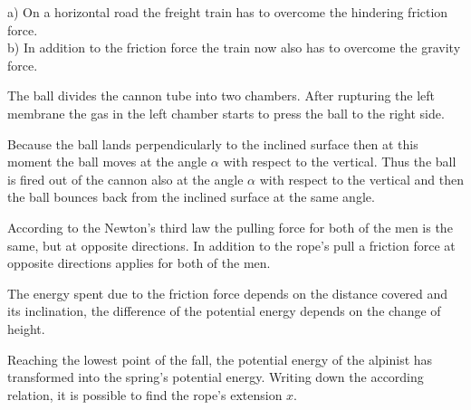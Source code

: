 \documentclass[11pt]{article}
\begin{document}
\hinteng
a) On a horizontal road the freight train has to overcome the hindering friction force.\\
b) In addition to the friction force the train now also has to overcome the gravity force.
\probend
\bigskip


\hinteng
The ball divides the cannon tube into two chambers. After rupturing the left membrane the gas in the left chamber starts to press the ball to the right side.
\probend
\bigskip


\hinteng
Because the ball lands perpendicularly to the inclined surface then at this moment the ball moves at the angle $\alpha$ with respect to the vertical. Thus the ball is fired out of the cannon also at the angle $\alpha$ with respect to the vertical and then the ball bounces back from the inclined surface at the same angle.
\probend
\bigskip


\hinteng
According to the Newton’s third law the pulling force for both of the men is the same, but at opposite directions. In addition to the rope’s pull a friction force at opposite directions applies for both of the men.
\probend
\bigskip


\hinteng
The energy spent due to the friction force depends on the distance covered and its inclination, the difference of the potential energy depends on the change of height.
\probend
\bigskip


\hinteng
Reaching the lowest point of the fall, the potential energy of the alpinist has transformed into the spring’s potential energy. Writing down the according relation, it is possible to find the rope’s extension $x$.
\probend
\bigskip
\end{document}
